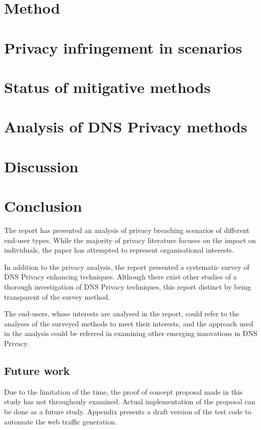 \documentclass[a4paper,12pt]{article}
\begin{document}
\newpage
\section{Method}\label{Method}


\newpage
\section{Privacy infringement in scenarios}


\newpage
\section{Status of mitigative methods}\label{surveyresults}



\newpage
\section{Analysis of DNS Privacy methods}

\newpage
	
\section{Discussion}

\newpage

\section{Conclusion}
The report has presented an analysis of privacy breaching scenarios of different end-user types.
While the majority of privacy literature focuses on the impact on individuals, the paper has attempted to represent organisational interests.

In addition to the privacy analysis, the report presented a systematic survey of DNS Privacy enhancing techniques. Although there exist other studies of a thorough investigation of DNS Privacy techniques, this report distinct by being transparent of the survey method. 

The end-users, whose interests are analysed in the report, could refer to the analyses of the surveyed methods to meet their interests, and the approach used in the analysis could be referred in examining other emerging innovations in DNS Privacy. 

\subsection{Future work}
Due to the limitation of the time, the proof of concept proposal made in this study has not throughouly examined. Actual implementation of the proposal can be done as a future study. Appendix presents a draft version of the test code to automate the web traffic generation.
\newpage
\end{document}
